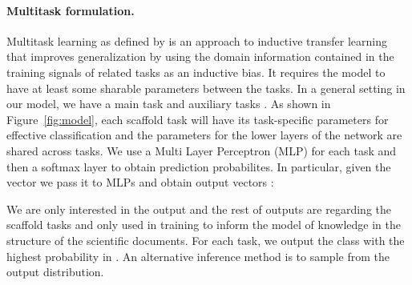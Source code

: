 \documentclass[11pt,a4paper]{article}
\begin{document}
\paragraph{Multitask formulation.}
Multitask learning as defined by \citet{Caruana1997MultitaskL} is an approach to inductive transfer learning that improves generalization by using the domain information contained in the training signals of related tasks as an inductive bias. It requires the model to have at least some sharable parameters between the tasks. In a general setting in our model, we have a main task  and  auxiliary tasks . As shown in Figure~\ref{fig:model}, each scaffold task will have its task-specific parameters for effective classification and the parameters for the lower layers of the network are shared across tasks. We use a Multi Layer Perceptron (MLP) for each task and then a softmax layer to obtain prediction probabilites. In particular, given the vector  we pass it to  MLPs and obtain  output vectors :


We are only interested in the output  and the rest of outputs  are regarding the scaffold tasks and only used in training to inform the model of knowledge in the structure of the scientific documents. For each task, we output the class with the highest probability in . An alternative inference method is to sample from the output distribution.

\setlength{\dashlinedash}{0.5pt}
\setlength{\dashlinegap}{1.0pt}
\setlength{\arrayrulewidth}{0.1pt}
\end{document}
